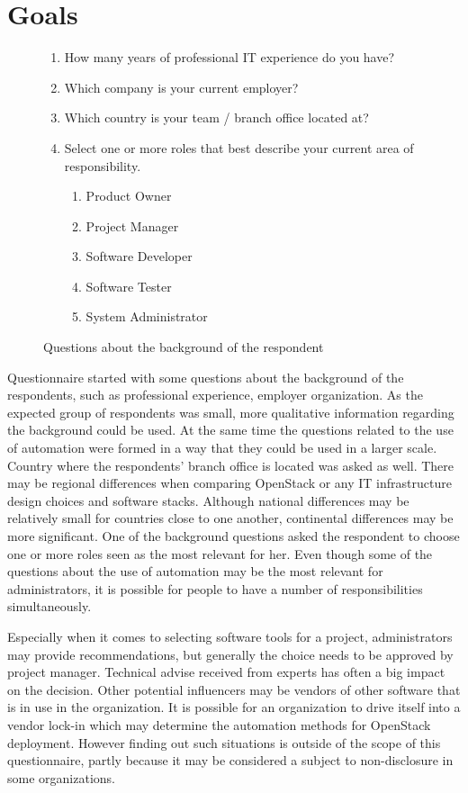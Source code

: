 \section{Goals}

\begin{figure}[t]
\centering
\begin{enumerate}
  \itemsep0em
  \item How many years of professional IT experience do you have?
  \item Which company is your current employer?
  \item Which country is your team / branch office located at?
  \item Select one or more roles that best describe your current area of
        responsibility.
  \begin{enumerate}
    \itemsep0em
    \item Product Owner
    \item Project Manager
    \item Software Developer
    \item Software Tester
    \item System Administrator
  \end{enumerate}
\end{enumerate}
\caption{Questions about the background of the respondent}
\label{fig:questionnaire-tool-details}
\end{figure}

Questionnaire started with some questions about the background of the
respondents, such as professional experience, employer organization. As the
expected group of respondents was small, more qualitative information regarding
the background could be used. At the same time the questions related to the use
of automation were formed in a way that they could be used in a larger scale.
Country where the respondents' branch office is located was asked as well.
There may be regional differences when comparing OpenStack or any IT
infrastructure design choices and software stacks. Although national
differences may be relatively small for countries close to one another,
continental differences may be more significant. One of the background
questions asked the respondent to choose one or more roles seen as the most
relevant for her. Even though some of the questions about the use of automation
may be the most relevant for administrators, it is possible for people to have
a number of responsibilities simultaneously.

Especially when it comes to selecting software tools for a project,
administrators may provide recommendations, but generally the choice needs to
be approved by project manager. Technical advise received from experts has
often a big impact on the decision. Other potential influencers may be vendors
of other software that is in use in the organization. It is possible for an
organization to drive itself into a vendor lock-in which may determine the
automation methods for OpenStack deployment. However finding out such
situations is outside of the scope of this questionnaire, partly because it may
be considered a subject to non-disclosure in some organizations.

